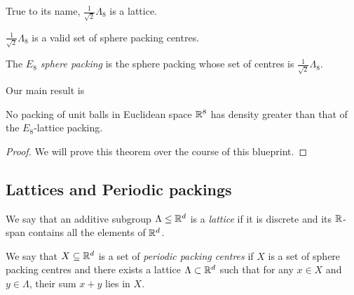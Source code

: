 \begin{lemma}\label{instLatticeE8}\leanok
  True to its name, $\frac{1}{\sqrt{2}}\Lambda_8$ is a lattice.
\end{lemma}

\begin{lemma}\label{instSpherePackingE8NormalisedLattice}\leanok
  $\frac{1}{\sqrt{2}}\Lambda_8$ is a valid set of sphere packing centres.
\end{lemma}

\begin{definition}\label{E8_Packing}\leanok
  The \emph{$E_8$ sphere packing} is the sphere packing whose set of centres is $\frac{1}{\sqrt{2}}\Lambda_8$.
\end{definition}

Our main result is
\begin{theorem}\label{Main}
No packing of unit balls in Euclidean space $\mathbb{R}^8$ has density greater than that of the $E_8$-lattice packing.
\end{theorem}
\begin{proof}
  We will prove this theorem over the course of this blueprint.
\end{proof}

\subsection{Lattices and Periodic packings}

\begin{definition}\label{EuclideanLattice.isLattice}\leanok
  We say that an additive subgroup $\Lambda \leq \mathbb{R}^d$ is a \emph{lattice} if it is discrete and its $\mathbb{R}$-span contains all the elements of $\mathbb{R}^d$.
\end{definition}

\begin{definition}\label{SpherePacking.PeriodicPackingCentres}\leanok
  We say that $X \subseteq \mathbb{R}^d$ is a set of \emph{periodic packing centres} if $X$ is a set of sphere packing centres and there exists a lattice $\Lambda \subset \mathbb{R}^d$ such that for any $x \in X$ and $y \in \Lambda$, their sum $x + y$ lies in $X$.
\end{definition}

